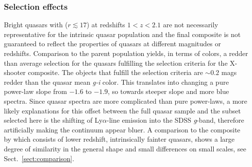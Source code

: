 \documentclass{aa}    %
\newcommand{\sectionname}{Sect.}
\newcommand{\Sect}[1]{\sectionname~\ref{sect:#1}}
\newcommand{\sect}[1]{\Sect{#1}}
\newcommand{\sectlabel}[1]{\label{sect:#1}}
\newcommand{\lya}{Ly$\alpha$}
\begin{document}
\subsubsection{Selection effects}  \sectlabel{Selection effects}
Bright quasars with ($r \lesssim 17$) at redshifts $1 < z < 2.1$ are
not necessarily representative for the intrinsic quasar population
\citep{Paris2014} and the final composite is not guaranteed to reflect
the properties of quasars at different magnitudes or
redshifts. Comparison to the parent population yields, in terms of
colors, a redder than average selection for the quasars fulfilling the
selection criteria for the X-shooter composite. The objects that
fulfill the selection criteria are $\sim 0.2$ mags redder than the
quasar mean \textit{g-i} color. This translates into changing a pure
power-law slope from $-1.6$ to $-1.9$, so towards steeper slope and
more blue spectra. Since quasar spectra are more complicated than pure
power-laws, a more likely explanations for this offset between the
full quasar sample and the subset selected here is the shifting of
\lya-line emission into the SDSS \textit{g}-band, therefore artificially making
the continuum appear bluer.  A comparison to the composite by
\citet{VandenBerk2001} which consists of lower redshift, intrinsically
fainter quasars, shows a large degree of similarity in the general
shape and small differences on small scales, see \sect{comparison}.
\end{document}
